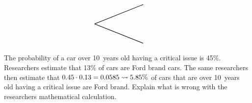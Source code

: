 \documentclass[12pt,letterpaper]{exam}
\begin{document}
\begin{questions}
\[\begin{tikzpicture}[scale= 1.0]
		\node at (3.75,-0.7) {\SecondUpLabel};
		\node at (3.75,-2.3) {\SecondDownLabel};
		\node at (4.1,-1.2) {\DownUp};
		\node at (4.1,-1.8) {\DownDown};
		\node at (5.75,-0.5) {\third};	
		\node at (5.75,-2.5) {\fourth};	
		\draw[thick] (2.5,-1.5) -- (5,-0.5);
		\draw[thick] (2.5,-1.5) -- (5,-2.5);
		\end{tikzpicture}
		\]



\newpage
\question[10] The probability of a car over 10~years old having a critical issue is 45\%. Researchers estimate that 13\% of cars are Ford brand cars. The same researchers then estimate that $0.45 \cdot 0.13= 0.0585 \rightsquigarrow 5.85\%$ of cars that are over 10~years old having a critical issue are Ford brand. Explain what is wrong with the researchers mathematical calculation. 


\end{questions}
\end{document}
